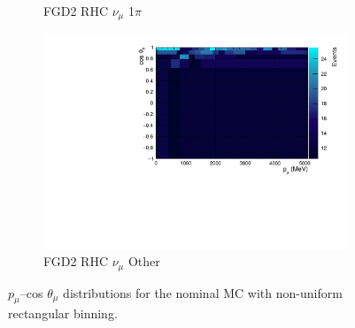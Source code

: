 \begin{figure}[!htbp]
\begin{subfigure}{.32\textwidth}
  \caption{FGD2 RHC $\nu_{\mu}$ 1$\pi$}
  \label{fig:th2polynomFGD2_NuMuBkg_CC1pi_in_AntiNu_Mode}
\end{subfigure}
\begin{subfigure}{.32\textwidth}
  \centering
  \includegraphics[width=0.95\linewidth]{figs/TH2PolyNom_MC_FGD2_NuMuBkg_CCOther_in_AntiNu_Mode}
  \caption{FGD2 RHC $\nu_{\mu}$ Other}
  \label{fig:th2polynomFGD2_NuMuBkg_CCOther_in_AntiNu_Mode}
\end{subfigure}
\caption{$p_{\mu}$--cos $\theta_{\mu}$ distributions for the nominal MC with non-uniform rectangular binning.}
\label{fig:th2polynombin}
\end{figure}

